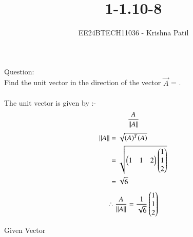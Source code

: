 \documentclass[journal]{IEEEtran}
\begin{document}

\vspace{3cm}

\title{1-1.10-8}
\author{EE24BTECH11036 - Krishna Patil}
{\let\newpage\relax\maketitle}
Question:\\
Find the unit vector in the direction of the vector  $\vec{A}$ = . \\ \\  
\solution
The unit vector is given by :-
\begin{align}
	\frac{A}{\left\lVert A\right\rVert}
\end{align}
\begin{align}
	\left\lVert A\right\rVert &= \sqrt{(A)^T(A)}\\
	&= \sqrt{\begin{pmatrix}1 & 1 & 2\end{pmatrix}\begin{pmatrix}1\\1\\2\end{pmatrix}}\\
	&= \sqrt{6} 
 \end{align}
\centering
\begin{align}
\therefore  \frac {A}{\left\lVert A\right\rVert} = \frac{1}{\sqrt{6}} \begin{pmatrix}1\\1\\2\end{pmatrix} \\
\end{align}
\begin{table}[h!]    
  \centering
  
  \caption{Given Vector}
  \label{tab1-1.9-6}
\end{table}
\end{document}
